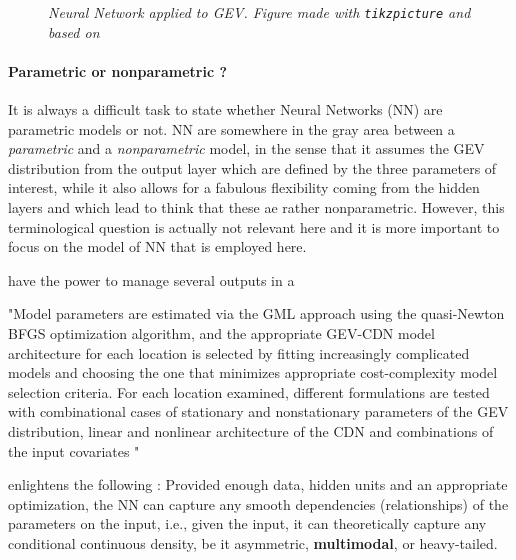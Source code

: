 \documentclass[11pt,a4paper,openany ]{book}
\begin{document}
\begin{figure}[!htb]
\begin{center}
{{
		}
	}
	\vspace{-2.5mm}
	\caption{\emph{ Neural Network applied to GEV. Figure made with \texttt{tikzpicture} and based on  \textcolor{JungleGreen}{\cite{cannon_flexible_2010}}} }
	\end{center}
\end{figure}

\paragraph*{Parametric or nonparametric ?}
It is always a difficult task to state whether Neural Networks (NN) are parametric models or not. NN  are somewhere in the gray area between a \emph{parametric} and a \emph{nonparametric} model, in the sense that it assumes the GEV distribution from the output layer which are defined by the three parameters of interest, while it also allows for a fabulous flexibility coming from the hidden layers and which lead to think that these ae rather nonparametric.
However, this terminological question is actually not relevant here and it is more important to focus on the model of NN that is employed here.

have the power to manage several outputs in a 

"Model parameters are estimated via the GML approach using the
quasi-Newton BFGS optimization algorithm, and the appropriate GEV-CDN model architecture for
each location is selected by fitting increasingly complicated models and choosing the one that
minimizes appropriate cost-complexity model selection criteria. For each location examined, different
formulations are tested with combinational cases of stationary and nonstationary parameters of the
GEV distribution, linear and nonlinear architecture of the CDN and combinations of the input covariates "


\cite{carreau_hybrid_2009} enlightens the following : Provided enough data, hidden units and an appropriate optimization, the NN can capture any smooth dependencies (relationships) of the parameters on the input, i.e., given the input, it can theoretically capture any conditional continuous density, be it asymmetric, \textbf{multimodal}, or heavy-tailed.
\end{document}
